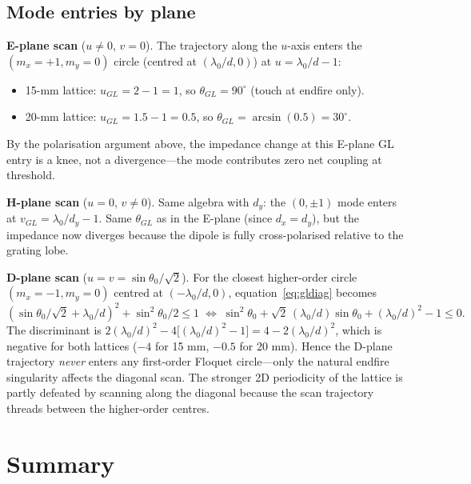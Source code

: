\documentclass{article}
\begin{document}
\subsection{Mode entries by plane}

\textbf{E-plane scan} ($u \neq 0$, $v = 0$). The trajectory along the $u$-axis enters the $(m_x = +1, m_y = 0)$ circle (centred at $(\lambda_0/d, 0)$) at $u = \lambda_0/d - 1$:
\begin{itemize}
\item 15-mm lattice: $u_{GL} = 2 - 1 = 1$, so $\theta_{GL} = 90^\circ$ (touch at endfire only).
\item 20-mm lattice: $u_{GL} = 1.5 - 1 = 0.5$, so $\theta_{GL} = \arcsin(0.5) = 30^\circ$.
\end{itemize}
By the polarisation argument above, the impedance change at this E-plane GL entry is a knee, not a divergence---the mode contributes zero net coupling at threshold.

\textbf{H-plane scan} ($u = 0$, $v \neq 0$). Same algebra with $d_y$: the $(0, \pm 1)$ mode enters at $v_{GL} = \lambda_0/d_y - 1$. Same $\theta_{GL}$ as in the E-plane (since $d_x = d_y$), but the impedance now diverges because the dipole is fully cross-polarised relative to the grating lobe.

\textbf{D-plane scan} ($u = v = \sin\theta_0/\sqrt{2}$). For the closest higher-order circle $(m_x = -1, m_y = 0)$ centred at $(-\lambda_0/d, 0)$, equation~\eqref{eq:gldiag} becomes
\begin{equation}
\left(\sin\theta_0/\sqrt{2} + \lambda_0/d\right)^2 + \sin^2\theta_0/2 \leq 1
\;\Leftrightarrow\;
\sin^2\theta_0 + \sqrt{2}\,(\lambda_0/d)\sin\theta_0 + (\lambda_0/d)^2 - 1 \leq 0.
\end{equation}
The discriminant is $2(\lambda_0/d)^2 - 4\big[(\lambda_0/d)^2 - 1\big] = 4 - 2(\lambda_0/d)^2$, which is negative for both lattices ($-4$ for 15 mm, $-0.5$ for 20 mm). Hence the D-plane trajectory \emph{never} enters any first-order Floquet circle---only the natural endfire singularity affects the diagonal scan. The stronger 2D periodicity of the lattice is partly defeated by scanning along the diagonal because the scan trajectory threads between the higher-order centres.

\section{Summary}
\end{document}
